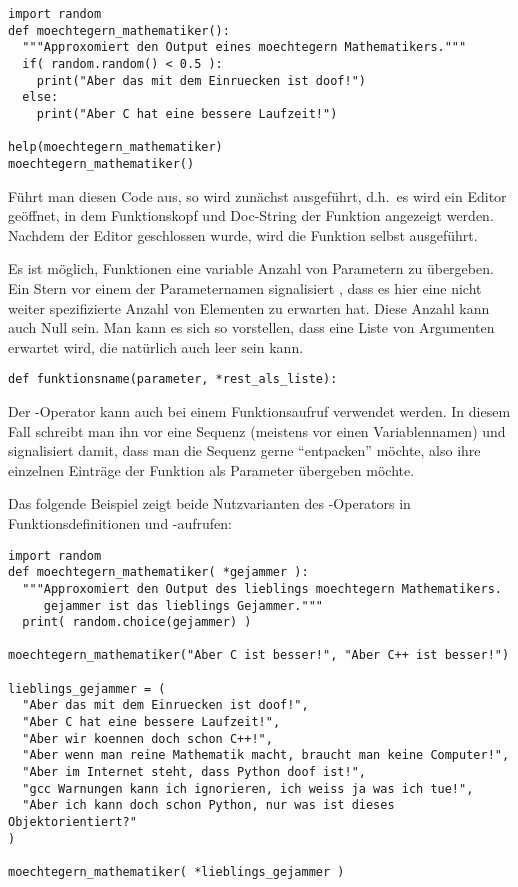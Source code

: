 \begin{lstlisting}
import random
def moechtegern_mathematiker():
  """Approxomiert den Output eines moechtegern Mathematikers."""
  if( random.random() < 0.5 ):
    print("Aber das mit dem Einruecken ist doof!")
  else:
    print("Aber C hat eine bessere Laufzeit!")

help(moechtegern_mathematiker)
moechtegern_mathematiker()
\end{lstlisting}

Führt man diesen Code aus, so wird zunächst  ausgeführt, d.h.\ es wird ein Editor 
geöffnet, in dem Funktionskopf und Doc-String der Funktion  angezeigt werden.
Nachdem der Editor geschlossen wurde, wird die Funktion selbst ausgeführt. 

Es ist möglich, Funktionen eine variable Anzahl von Parametern zu übergeben. Ein Stern vor einem der Parameternamen 
signalisiert \Python, dass es hier eine nicht weiter spezifizierte Anzahl von Elementen zu erwarten hat. Diese Anzahl kann 
auch Null sein. Man kann es sich so vorstellen, dass eine Liste von Argumenten erwartet wird, die natürlich auch leer sein 
kann. 

\begin{lstlisting}
def funktionsname(parameter, *rest_als_liste):
\end{lstlisting}

Der \lpy{*}-Operator kann auch bei einem Funktionsaufruf verwendet werden. In diesem Fall schreibt man ihn vor eine 
Sequenz (meistens vor einen Variablennamen) und signalisiert damit, dass man die Sequenz gerne ``entpacken'' möchte, 
also ihre einzelnen Einträge der Funktion als Parameter übergeben möchte.

Das folgende Beispiel zeigt beide Nutzvarianten des \lpy{*}-Operators in Funktionsdefinitionen und -aufrufen:

\begin{lstlisting}
import random
def moechtegern_mathematiker( *gejammer ):
  """Approxomiert den Output des lieblings moechtegern Mathematikers.
     gejammer ist das lieblings Gejammer."""
  print( random.choice(gejammer) )

moechtegern_mathematiker("Aber C ist besser!", "Aber C++ ist besser!")

lieblings_gejammer = (
  "Aber das mit dem Einruecken ist doof!",
  "Aber C hat eine bessere Laufzeit!",
  "Aber wir koennen doch schon C++!",
  "Aber wenn man reine Mathematik macht, braucht man keine Computer!",
  "Aber im Internet steht, dass Python doof ist!",
  "gcc Warnungen kann ich ignorieren, ich weiss ja was ich tue!",
  "Aber ich kann doch schon Python, nur was ist dieses Objektorientiert?"
)

moechtegern_mathematiker( *lieblings_gejammer )
\end{lstlisting}

